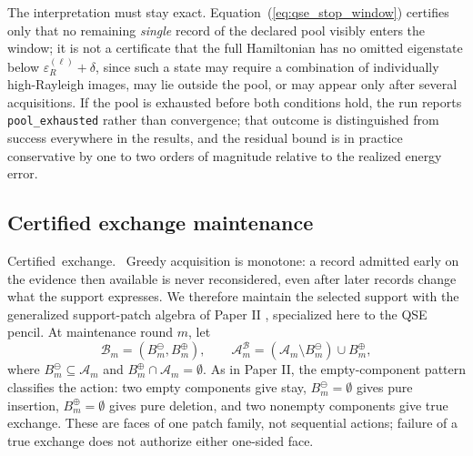 \documentclass[
  reprint,
  amsmath,
  amssymb,
  aps,
  pra,
  nofootinbib,
  superscriptaddress,
  floatfix
]{revtex4-2}
\newcommand{\tentative}[1]{\textcolor{red!70!black}{#1}}
\newcommand{\structlabel}[1]{\noindent\mbox{\tentative{#1.}}~}
\newcommand{\Acal}{\mathcal{A}}
\begin{document}
The interpretation must stay exact.  Equation~(\ref{eq:qse_stop_window}) certifies only that no remaining \emph{single} record of the declared pool visibly enters the window; it is not a certificate that the full Hamiltonian has no omitted eigenstate below $\varepsilon_R^{(\ell)}+\delta$, since such a state may require a combination of individually high-Rayleigh images, may lie outside the pool, or may appear only after several acquisitions.  If the pool is exhausted before both conditions hold, the run reports \texttt{pool\_exhausted} rather than convergence; that outcome is distinguished from success everywhere in the results, and the residual bound is in practice conservative by one to two orders of magnitude relative to the realized energy error.

\subsection{Certified exchange maintenance}
\label{sec:exchange_maintenance}

\structlabel{Certified exchange}
Greedy acquisition is monotone: a record admitted early on the evidence then available is never reconsidered, even after later records change what the support expresses.  We therefore maintain the selected support with the generalized support-patch algebra of Paper II \cite{PaperII}, specialized here to the QSE pencil.  At maintenance round $m$, let
\begin{equation}
\mathcal B_m=(B_m^{\ominus},B_m^{\oplus}),
\qquad
\Acal_m^{\mathcal B}
=
(\Acal_m\setminus B_m^{\ominus})\cup B_m^{\oplus},
\label{eq:qse_exchange_patch}
\end{equation}
where $B_m^{\ominus}\subseteq\Acal_m$ and $B_m^{\oplus}\cap\Acal_m=\emptyset$.  As in Paper II, the empty-component pattern classifies the action: two empty components give stay, $B_m^{\ominus}=\emptyset$ gives pure insertion, $B_m^{\oplus}=\emptyset$ gives pure deletion, and two nonempty components give true exchange.  These are faces of one patch family, not sequential actions; failure of a true exchange does not authorize either one-sided face.
\end{document}
